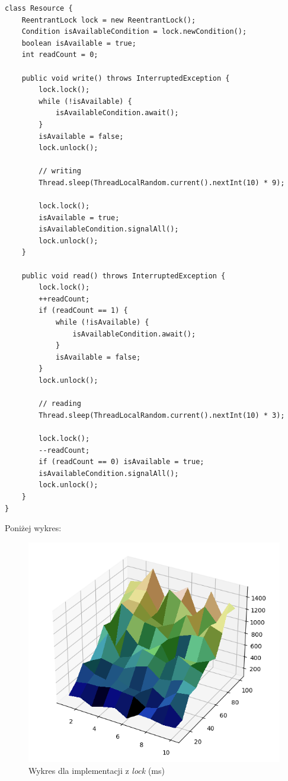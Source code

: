 \documentclass{article}
\begin{document}
\begin{verbatim}
class Resource {
    ReentrantLock lock = new ReentrantLock();
    Condition isAvailableCondition = lock.newCondition();
    boolean isAvailable = true;
    int readCount = 0;

    public void write() throws InterruptedException {
        lock.lock();
        while (!isAvailable) {
            isAvailableCondition.await();
        }
        isAvailable = false;
        lock.unlock();

        // writing
        Thread.sleep(ThreadLocalRandom.current().nextInt(10) * 9);

        lock.lock();
        isAvailable = true;
        isAvailableCondition.signalAll();
        lock.unlock();
    }

    public void read() throws InterruptedException {
        lock.lock();
        ++readCount;
        if (readCount == 1) {
            while (!isAvailable) {
                isAvailableCondition.await();
            }
            isAvailable = false;
        }
        lock.unlock();

        // reading
        Thread.sleep(ThreadLocalRandom.current().nextInt(10) * 3);

        lock.lock();
        --readCount;
        if (readCount == 0) isAvailable = true;
        isAvailableCondition.signalAll();
        lock.unlock();
    }
}
\end{verbatim}

Poniżej wykres:

\begin{figure}[H]
    \centering
    \includegraphics[width=\textwidth]{figure_2.png}
    \caption{Wykres dla implementacji z \textit{lock} (ms)}
\end{figure}
\end{document}
